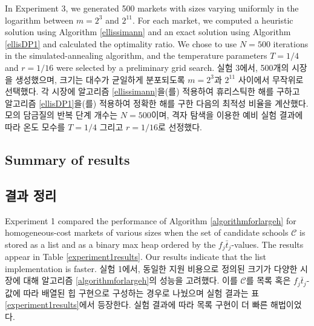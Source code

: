 \documentclass[11pt]{article} %
\theoremstyle{definition}
\theoremstyle{definition}
\begin{document}
\ifen
In Experiment 3, we generated 500 markets with sizes varying uniformly in the logarithm between $m = 2^3$ and $2^{11}$. For each market, we computed a heuristic solution using Algorithm \ref{ellissimann} and an exact solution using Algorithm \ref{ellisDP1} and calculated the optimality ratio. We chose to use $N = 500$ iterations in the simulated-annealing algorithm, and the temperature parameters $T = 1/4$ and $r = 1/16$ were selected by a preliminary grid search.  
\else
실험 3에서, 500개의 시장을 생성했으며, 크기는 대수가 균일하게 분포되도록 $m = 2^3$과 $2^{11}$ 사이에서 무작위로 선택했다. 각 시장에 알고리즘 \ref{ellissimann}을(를) 적용하여 휴리스틱한 해를 구하고 알고리즘 \ref{ellisDP1}을(를) 적용하여 정확한 해를 구한 다음의 최적성 비율을 계산했다. 모의 담금질의 반복 단계 개수는 $N = 500$이며, 격자 탐색을 이용한 예비 실험 결과에 따라 온도 모수를 $T = 1/4$ 그리고 $r = 1/16$로 선정했다.
\fi

\ifen \subsection{Summary of results} \else \subsection{결과 정리}\fi
\ifen
Experiment 1 compared the performance of Algorithm \ref{algorithmforlargeh} for homogeneous-cost markets of various sizes when the set of candidate schools $\mathcal{C}$ is stored as a list and as a binary max heap ordered by the $f_j \bar t_j$-values. The results appear in Table \ref{experiment1results}. Our results indicate that the list implementation is faster. %
\else
실험 1에서, 동일한 지원 비용으로 정의된 크기가 다양한 시장에 대해 알고리즘 \ref{algorithmforlargeh}의 성능을 고려했다. 이를 $\mathcal{C}$를 목록 혹은 $f_j \bar t_j$-값에 따라 배열된 힙 구현으로 구성하는 경우로 나눴으며 실험 결과는 표 \ref{experiment1results}에서 등장한다. 실험 결과에 따라 목록 구현이 더 빠른 해법이었다. %
\fi
\end{document}
